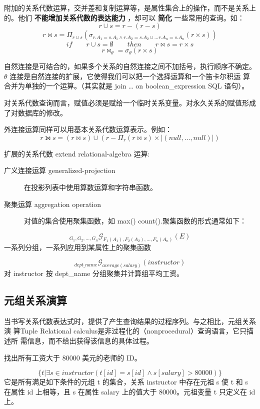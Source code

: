 \documentclass{dingjia}
\begin{document}
附加的关系代数运算，交并差和复制运算等，是属性集合上的操作，而不是关系上的。他们 \textbf{不能增加关系代数的表达能力} ，却可以 \textbf{简化} 一些常用的查询。如：
\[ r \cup s = r - (r - s) \]
\[ r \bowtie s = \Pi_{r \cup s}(\sigma_{r.{A_1} = s.{A_1} \land r.{A_2} = s.{A_2} \cup \ldots r.{A_n} = s.{A_n}}(r \times s)) \]
\[ if \qquad r \cup s = \emptyset \qquad then \qquad  r \bowtie s = r \times s \]
\[ r \bowtie_{\theta} = \sigma_{\theta}(r \times s) \]

自然连接是可结合的，如果多个关系的自然连接之间不加括号，执行顺序不确定。
$\theta$ 连接是自然连接的扩展，它使得我们可以把一个选择运算和一个笛卡尔积运
算合并为单独的一个运算。（其实就是 join \ldots{} on boolean\_expression SQL
语句）。

对关系代数查询而言，赋值必须是赋给一个临时关系变量。对永久关系的赋值形成了对数据库的修改。

外连接运算同样可以用基本关系代数运算表示。例如：
\[r ⟕ s = (r \bowtie s) \cup (r - \Pi_{r}(r \bowtie s) \times |(null,\ldots , null)|) \]

扩展的关系代数 extend relational-algebra 运算:
\begin{description}
  \item[{广义连接运算 generalized-projection}] 在投影列表中使用算数运算和字符串函数。
  \item[{聚集运算 aggregation operation}] 对值的集合使用聚集函数，如 max()
  count().聚集函数的形式通常如下：
\end{description}
\[ {}_{G_1 , G_2 , \ldots , G_n}{\mathcal{G}}_{F_1(A_1),F_2(A_2),\ldots , F_n(A_n)}(E) \] 一系列分组，一系列应用到某属性上的聚集函数

\[ {}_{dept\_name} {\mathcal{G}}_{average(salary)}(instructor) \]
对 instructor 按 dept\_name 分组聚集并计算组平均工资。

\subsection*{元组关系演算}\label{sec:org909f97d}

当书写关系代数表达式时，提供了产生查询结果的过程序列。与之相比，元组关系演
算Tuple Relational calculus是非过程化的（nonprocedural）查询语言，它只描述所
需信息，而不给出获得该信息的具体过程。

找出所有工资大于 80000 美元的老师的 ID。

\[ \{t | \exists s \in instructor (t[id] = s[id] \land s[salary] > 80000)\}
\]
它是所有满足如下条件的元组 t 的集合，关系 instructor 中存在元祖 s 使 t 和
s 在属性 id 上相等，且 s 在属性 salary 上的值大于 80000。元祖变量 t 只定义在 id
上。
\end{document}
